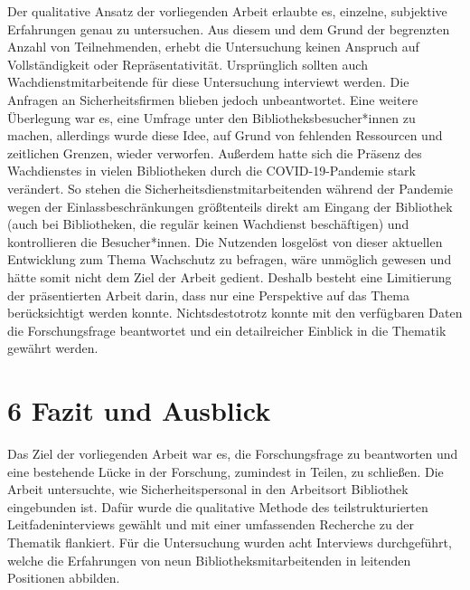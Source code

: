 \documentclass[a4paper,
fontsize=11pt,
oneside,
numbers=noperiodatend,
parskip=half-,
bibliography=totoc,
final
]{scrartcl}
\begin{document}
Der qualitative Ansatz der vorliegenden Arbeit erlaubte es, einzelne,
subjektive Erfahrungen genau zu untersuchen. Aus diesem und dem Grund
der begrenzten Anzahl von Teilnehmenden, erhebt die Untersuchung keinen
Anspruch auf Vollständigkeit oder Repräsentativität. Ursprünglich
sollten auch Wachdienstmitarbeitende für diese Untersuchung interviewt
werden. Die Anfragen an Sicherheitsfirmen blieben jedoch unbeantwortet.
Eine weitere Überlegung war es, eine Umfrage unter den
Bibliotheksbesucher*innen zu machen, allerdings wurde diese Idee, auf
Grund von fehlenden Ressourcen und zeitlichen Grenzen, wieder verworfen.
Außerdem hatte sich die Präsenz des Wachdienstes in vielen Bibliotheken
durch die COVID-19-Pandemie stark verändert. So stehen die
Sicherheitsdienstmitarbeitenden während der Pandemie wegen der
Einlassbeschränkungen größtenteils direkt am Eingang der Bibliothek
(auch bei Bibliotheken, die regulär keinen Wachdienst beschäftigen) und
kontrollieren die Besucher*innen. Die Nutzenden losgelöst von dieser
aktuellen Entwicklung zum Thema Wachschutz zu befragen, wäre unmöglich
gewesen und hätte somit nicht dem Ziel der Arbeit gedient. Deshalb
besteht eine Limitierung der präsentierten Arbeit darin, dass nur eine
Perspektive auf das Thema berücksichtigt werden konnte. Nichtsdestotrotz
konnte mit den verfügbaren Daten die Forschungsfrage beantwortet und ein
detailreicher Einblick in die Thematik gewährt werden.

\hypertarget{fazit-und-ausblick}{%
\section{6 Fazit und Ausblick}\label{fazit-und-ausblick}}

Das Ziel der vorliegenden Arbeit war es, die Forschungsfrage zu
beantworten und eine bestehende Lücke in der Forschung, zumindest in
Teilen, zu schließen. Die Arbeit untersuchte, wie Sicherheitspersonal in
den Arbeitsort Bibliothek eingebunden ist. Dafür wurde die qualitative
Methode des teilstrukturierten Leitfadeninterviews gewählt und mit einer
umfassenden Recherche zu der Thematik flankiert. Für die Untersuchung
wurden acht Interviews durchgeführt, welche die Erfahrungen von neun
Bibliotheksmitarbeitenden in leitenden Positionen abbilden.
\end{document}
